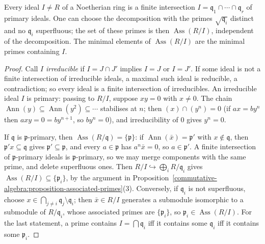 \begin{theorem}\label{commutative-algebra:theorem-primary-decomposition}
Every ideal $I \neq R$ of a Noetherian ring is a finite intersection $I = \mathfrak{q}_1 \cap \cdots \cap \mathfrak{q}_r$ of primary ideals.
One can choose the decomposition with the primes $\sqrt{\mathfrak{q}_i}$ distinct and no $\mathfrak{q}_i$ superfluous; the set of these
primes is then $\operatorname{Ass}(R/I)$, independent of the decomposition. The minimal elements of $\operatorname{Ass}(R/I)$ are the minimal
primes containing $I$.
\end{theorem}

\begin{proof}
Call $I$ \emph{irreducible} if $I = J \cap J'$ implies $I = J$ or $I = J'$. If some ideal is not a finite intersection of irreducible
ideals, a maximal such ideal is reducible, a contradiction; so every ideal is a finite intersection of irreducibles. An
irreducible ideal $I$ is primary: passing to $R/I$, suppose $xy = 0$ with $x \neq 0$. The chain
$\operatorname{Ann}(y) \subseteq \operatorname{Ann}(y^2) \subseteq \cdots$ stabilises at $n$; then $(x) \cap (y^n) = 0$ (if $ax = by^n$ then $axy = 0 = by^{n+1}$, so
$by^n = 0$), and irreducibility of $0$ gives $y^n = 0$.

If $\mathfrak{q}$ is $\mathfrak{p}$-primary, then $\operatorname{Ass}(R/\mathfrak{q}) = \{\mathfrak{p}\}$: if $\operatorname{Ann}(\bar x) = \mathfrak{p}'$ with $x \notin \mathfrak{q}$, then
$\mathfrak{p}' x \subseteq \mathfrak{q}$ gives $\mathfrak{p}' \subseteq \mathfrak{p}$, and every $a \in \mathfrak{p}$ has $a^n\bar x = 0$, so $a \in \mathfrak{p}'$. A finite
intersection of $\mathfrak{p}$-primary ideals is $\mathfrak{p}$-primary, so we may merge components with the same prime, and delete
superfluous ones. Then $R/I \hookrightarrow \bigoplus_i R/\mathfrak{q}_i$ gives $\operatorname{Ass}(R/I) \subseteq \{\mathfrak{p}_i\}$, by the argument in
Proposition~\ref{commutative-algebra:proposition-associated-primes}(3). Conversely, if $\mathfrak{q}_i$ is not superfluous, choose
$x \in \bigcap_{j \neq i}\mathfrak{q}_j \setminus \mathfrak{q}_i$; then $\bar x \in R/I$ generates a submodule isomorphic to a submodule of
$R/\mathfrak{q}_i$, whose associated primes are $\{\mathfrak{p}_i\}$, so $\mathfrak{p}_i \in \operatorname{Ass}(R/I)$. For the last statement, a prime contains
$I = \bigcap \mathfrak{q}_i$ iff it contains some $\mathfrak{q}_i$ iff it contains some $\mathfrak{p}_i$.
\end{proof}

